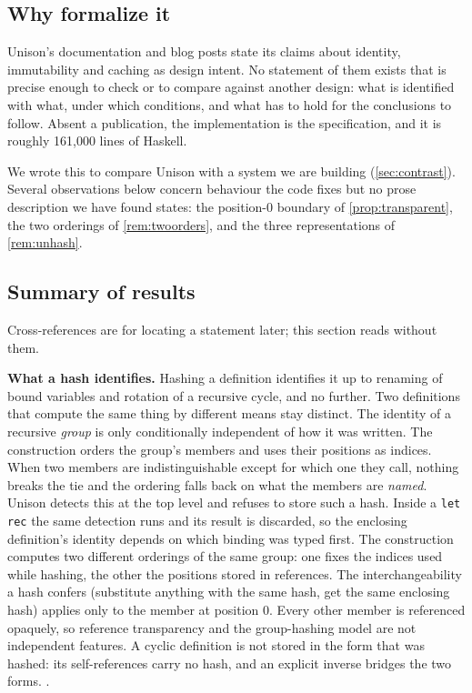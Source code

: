\documentclass[11pt]{article}
\theoremstyle{definition}
\theoremstyle{plain}
\theoremstyle{remark}
\begin{document}
\subsection{Why formalize it}

Unison's documentation and blog posts state its claims about identity, immutability and caching as
design intent. No statement of them exists that is precise enough to check or to compare against
another design: what is identified with what, under which conditions, and what has to hold for the
conclusions to follow. Absent a publication, the implementation is the specification, and it is
roughly 161{,}000 lines of Haskell.

We wrote this to compare Unison with a system we are building (\cref{sec:contrast}). Several
observations below concern behaviour the code fixes but no prose description we have found states:
the position-$0$ boundary of \cref{prop:transparent}, the two orderings of \cref{rem:twoorders}, and
the three representations of \cref{rem:unhash}.

\subsection{Summary of results}\label{sec:summary}

Cross-references are for locating a statement later; this section reads without them.

\textbf{What a hash identifies.} Hashing a definition identifies it up to renaming of bound variables
and rotation of a recursive cycle, and no further. Two definitions that compute the same thing by
different means stay distinct. The identity of a recursive \emph{group} is only conditionally
independent of how it was written. The construction orders the group's members and uses their
positions as indices. When two members are indistinguishable except for which one they call, nothing
breaks the tie and the ordering falls back on what the members are \emph{named}. Unison detects this
at the top level and refuses to store such a hash. Inside a \texttt{let rec} the same detection runs
and its result is discarded, so the enclosing definition's identity depends on which binding was
typed first. The construction computes two different orderings of the same group: one fixes the
indices used while hashing, the other the positions stored in references. The interchangeability a
hash confers (substitute anything with the same hash, get the same enclosing hash) applies only to the
member at position $0$. Every other member is referenced opaquely, so reference transparency and the
group-hashing model are not independent features. A cyclic definition is not stored in the form that
was hashed: its self-references carry no hash, and an explicit inverse bridges the two forms.
.
\end{document}
